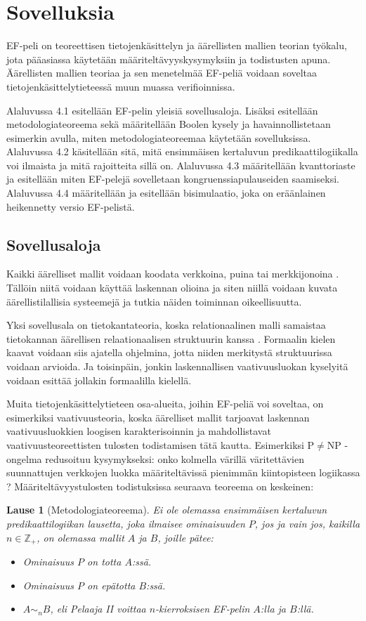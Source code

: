 \documentclass[finnish]{tktltiki2}
\newtheorem{lau}{Lause}
\theoremstyle{definition}
\theoremstyle{remark}
\begin{document}
\section{Sovelluksia}
EF-peli on teoreettisen tietojenkäsittelyn ja äärellisten mallien teorian työkalu, jota pääasiassa käytetään määriteltävyyskysymyksiin ja todistusten apuna. Äärellisten mallien teoriaa ja sen menetelmää EF-peliä voidaan soveltaa tietojenkäsittelytieteessä muun muassa verifioinnissa. 

Alaluvussa 4.1 esitellään EF-pelin yleisiä sovellusaloja. Lisäksi esitellään metodologiateoreema sekä määritellään Boolen kysely ja havainnollistetaan esimerkin avulla, miten metodologiateoreemaa käytetään sovelluksissa. Alaluvussa 4.2 käsitellään sitä, mitä ensimmäisen kertaluvun predikaattilogiikalla voi ilmaista ja mitä rajoitteita sillä on. Alaluvussa 4.3 määritellään kvanttoriaste ja esitellään miten EF-pelejä sovelletaan kongruenssiapulauseiden saamiseksi. Alaluvussa 4.4 määritellään ja esitellään bisimulaatio, joka on eräänlainen heikennetty versio EF-pelistä.

\subsection{Sovellusaloja}
Kaikki äärelliset mallit voidaan koodata verkkoina, puina tai merkkijonoina \cite{Ebb99}. Tällöin niitä voidaan käyttää laskennan olioina ja siten niillä voidaan kuvata äärellistilallisia systeemejä ja tutkia näiden toiminnan oikeellisuutta. 

Yksi sovellusala on tietokantateoria, koska relationaalinen malli samaistaa tietokannan äärellisen relaationaalisen struktuurin kanssa \cite{Luo10}. Formaalin kielen kaavat voidaan siis ajatella ohjelmina, jotta niiden merkitystä struktuurissa voidaan arvioida. Ja toisinpäin, jonkin laskennallisen vaativuusluokan kyselyitä voidaan esittää jollakin formaalilla kielellä.

Muita tietojenkäsittelytieteen osa-alueita, joihin EF-peliä voi soveltaa, on esimerkiksi vaativuusteoria, koska äärelliset mallit tarjoavat laskennan vaativuusluokkien loogisen karakterisoinnin ja mahdollistavat vaativuusteoreettisten tulosten todistamisen tätä kautta. Esimerkiksi $\mathrm{P} \neq \mathrm{NP}$ -ongelma redusoituu kysymykseksi: onko kolmella värillä väritettävien suunnattujen verkkojen luokka määriteltävissä pienimmän kiintopisteen logiikassa \cite{Imm86}? Määriteltävyystulosten todistuksissa seuraava teoreema on keskeinen:

\begin{lau}[Metodologiateoreema]
Ei ole olemassa ensimmäisen kertaluvun predikaattilogiikan lausetta, joka ilmaisee ominaisuuden $P$, jos ja vain jos, kaikilla $n \in \mathbb{Z}_+$, on olemassa mallit $A$ ja $B$, joille pätee:
\begin{itemize}
\item Ominaisuus $P$ on totta $A$:ssä.
\item Ominaisuus $P$ on epätotta $B$:ssä.
\item $A \sim_n B$, eli Pelaaja II voittaa $n$-kierroksisen EF-pelin $A$:lla ja $B$:llä.
\end{itemize}
\end{lau}
\end{document}
